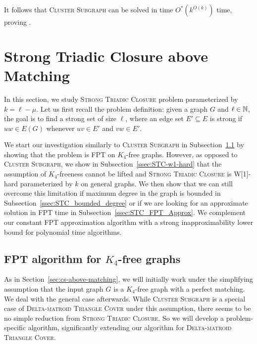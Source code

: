 It follows that \textsc{Cluster Subgraph} can be solved in time $O^*(k^{O(k)})$ time, proving .

\section{Strong Triadic Closure above Matching}
\label{sec:tcam}

In this section, 
we study \textsc{Strong Triadic Closure} problem parameterized by $k = \ell - \mu$. Let us first recall the problem definition: 
given a graph $G$ and $\ell \in \mathbb N$, the goal is to find a strong set of size $\ell$, where an edge set $E' \subseteq E$ is strong if $uw \in E(G)$ whenever $uv \in E'$ and $vw \in E'$.

We start our investigation similarly to \textsc{Cluster Subgraph} in Subsection~\ref{ssec:tcamfpt} by showing that the problem is FPT on $K_4$-free graphs. However, as opposed to \textsc{Cluster Subgraph}, we show in Subsection~\ref{ssec:STC-w1-hard} that the assumption of $K_4$-freeness cannot be lifted and \textsc{Strong Triadic Closure} is W[1]-hard parameterized by $k$ on general graphs. We then show that we can still overcome this limitation if maximum degree in the graph is bounded in Subsection~\ref{ssec:STC_bounded_degree} or if we are looking for an approximate solution in FPT time in Subsection~\ref{ssec:STC_FPT_Approx}. We complement our constant FPT approximation algorithm with a strong inapproximability lower bound for polynomial time algorithms.



\subsection{FPT algorithm for $K_4$-free graphs} \label{ssec:tcamfpt}

As in Section~\ref{sec:cs-above-matching}, we will initially work under the simplifying assumption that the input graph $G$ is a $K_4$-free graph with a perfect matching.
We deal with the general case afterwards.
While \textsc{Cluster Subgraph} is a special case of \textsc{Delta-matroid Triangle Cover} under this assumption, there seems to be no simple reduction from \textsc{Strong Triadic Closure}.
So we will develop a problem-specific algorithm, significantly extending our algorithm for \textsc{Delta-matroid Triangle Cover}.

